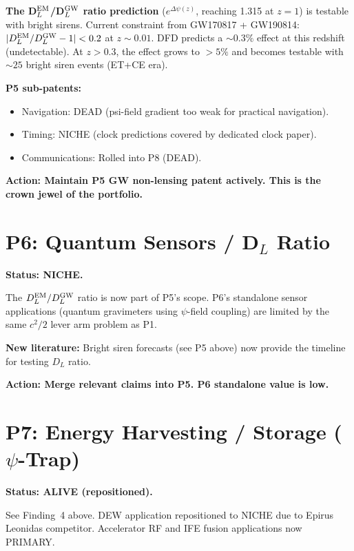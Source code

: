 \documentclass[11pt]{article}
\begin{document}
\textbf{The D$_L^{\rm EM}$/D$_L^{\rm GW}$ ratio prediction}
($e^{\Delta\psi(z)}$, reaching 1.315 at $z = 1$) is testable with
bright sirens.  Current constraint from GW170817 + GW190814:
$|D_L^{\rm EM}/D_L^{\rm GW} - 1| < 0.2$ at $z \sim 0.01$.
DFD predicts a $\sim 0.3\%$ effect at this redshift (undetectable).
At $z > 0.3$, the effect grows to $>5\%$ and becomes testable with
$\sim 25$ bright siren events (ET+CE era).

\textbf{P5 sub-patents:}
\begin{itemize}
\item Navigation: DEAD (psi-field gradient too weak for practical navigation).
\item Timing: NICHE (clock predictions covered by dedicated clock paper).
\item Communications: Rolled into P8 (DEAD).
\end{itemize}

\textbf{Action: Maintain P5 GW non-lensing patent actively.  This is
the crown jewel of the portfolio.}


\section{P6: Quantum Sensors / D$_L$ Ratio}

\textbf{Status: NICHE.}

The $D_L^{\rm EM}/D_L^{\rm GW}$ ratio is now part of P5's scope.
P6's standalone sensor applications (quantum gravimeters using
$\psi$-field coupling) are limited by the same $c^2/2$ lever arm
problem as P1.

\textbf{New literature:}  Bright siren forecasts (see P5 above) now
provide the timeline for testing $D_L$ ratio.

\textbf{Action: Merge relevant claims into P5.  P6 standalone value is low.}


\section{P7: Energy Harvesting / Storage ($\psi$-Trap)}

\textbf{Status: ALIVE (repositioned).}

See Finding~4 above.  DEW application repositioned to NICHE due to
Epirus Leonidas competitor.  Accelerator RF and IFE fusion applications
now PRIMARY.
\end{document}
